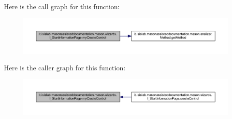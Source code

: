 Here is the call graph for this function\-:
\nopagebreak
\begin{figure}[H]
\begin{center}
\leavevmode
\includegraphics[width=350pt]{classit_1_1isislab_1_1masonassisteddocumentation_1_1mason_1_1wizards_1_1_i___start_information_page_ae0a18d33050e71d0c590f8da3f4a3390_cgraph}
\end{center}
\end{figure}




Here is the caller graph for this function\-:
\nopagebreak
\begin{figure}[H]
\begin{center}
\leavevmode
\includegraphics[width=350pt]{classit_1_1isislab_1_1masonassisteddocumentation_1_1mason_1_1wizards_1_1_i___start_information_page_ae0a18d33050e71d0c590f8da3f4a3390_icgraph}
\end{center}
\end{figure}




